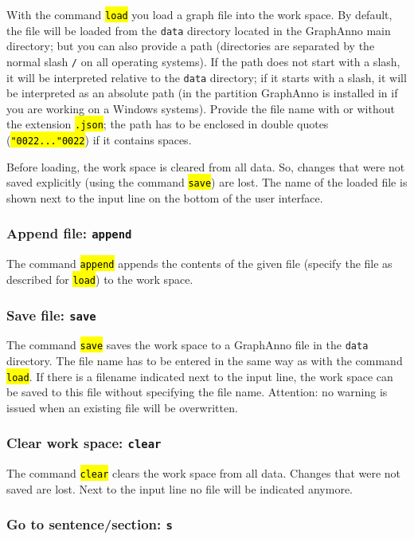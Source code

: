 \documentclass[12pt]{scrartcl}
\newcommand{\quo}{\char"0022}
\newcommand{\code}[1]{\hl{\texttt{#1}}}
\begin{document}
With the command \code{load} you load a graph file into the work space.
By default, the file will be loaded from the \texttt{data} directory located in the GraphAnno main directory; but you can also provide a path (directories are separated by the normal slash \texttt{/} on all operating systems).
If the path does not start with a slash, it will be interpreted relative to the \texttt{data} directory; if it starts with a slash, it will be interpreted as an absolute path (in the partition GraphAnno is installed in if you are working on a Windows systems).
Provide the file name with or without the extension \code{.json}; the path has to be enclosed in double quotes (\code{\quo...\quo}) if it contains spaces.

Before loading, the work space is cleared from all data.
So, changes that were not saved explicitly (using the command \code{save}) are lost.
The name of the loaded file is shown next to the input line on the bottom of the user interface.


\subsubsection{Append file: \texttt{append}}

The command \code{append} appends the contents of the given file (specify the file as described for \code{load}) to the work space.


\subsubsection{Save file: \texttt{save}}

The command \code{save} saves the work space to a GraphAnno file in the \texttt{data} directory.
The file name has to be entered in the same way as with the command \code{load}.
If there is a filename indicated next to the input line, the work space can be saved to this file without specifying the file name.
Attention: no warning is issued when an existing file will be overwritten.


\subsubsection{Clear work space: \texttt{clear}}

The command \code{clear} clears the work space from all data.
Changes that were not saved are lost.
Next to the input line no file will be indicated anymore.


\subsubsection{Go to sentence/section: \texttt{s}}\label{befehl-s}
\end{document}

